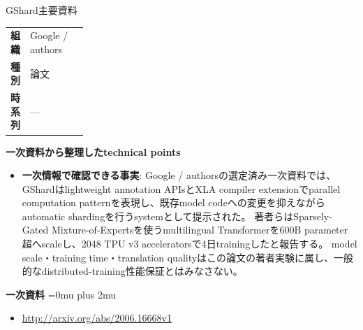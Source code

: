 \begin{technicalnote}{GShard}{主要資料}
\begingroup
\begin{tabularx}{\linewidth}{@{}>{\bfseries}p{0.22\linewidth}X@{}}
組織 & Google / authors \\
種別 & 論文 \\
時系列 & — \\
\end{tabularx}
\smallskip
{\bfseries 一次資料から整理したtechnical points}
\begin{itemize}[leftmargin=1.5em,itemsep=0.35em]
\item \textbf{一次情報で確認できる事実}: Google / authorsの選定済み一次資料では、GShardはlightweight annotation APIsとXLA compiler extensionでparallel computation patternを表現し、既存model codeへの変更を抑えながらautomatic shardingを行うsystemとして提示された。 著者らはSparsely-Gated Mixture-of-Expertsを使うmultilingual Transformerを600B parameter超へscaleし、2048 TPU v3 acceleratorsで4日trainingしたと報告する。 model scale・training time・translation qualityはこの論文の著者実験に属し、一般的なdistributed-training性能保証とはみなさない。
\end{itemize}
\begin{minipage}{\linewidth}
\begin{samepage}
{\bfseries 一次資料}
\begingroup\sloppy
\Urlmuskip=0mu plus 2mu\relax
\begin{itemize}[leftmargin=1.5em,itemsep=0.25em]
\item {\scriptsize\url{http://arxiv.org/abs/2006.16668v1}}
\end{itemize}
\endgroup
\end{samepage}
\end{minipage}
\endgroup
\end{technicalnote}
\medskip
